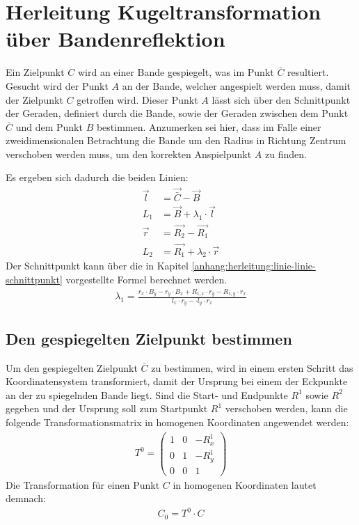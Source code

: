 \section{Herleitung Kugeltransformation über Bandenreflektion}\label{anhang:herleitung:bandenreflektion}
Ein Zielpunkt $C$ wird an einer Bande gespiegelt, was im Punkt $\bar{C}$ resultiert. Gesucht wird der Punkt $A$ an
der Bande, welcher angespielt werden muss, damit der Zielpunkt $C$ getroffen wird. Dieser Punkt $A$ lässt sich über
den Schnittpunkt der Geraden, definiert durch die Bande, sowie der Geraden zwischen dem Punkt $\bar{C}$ und dem Punkt
$B$ bestimmen. Anzumerken sei hier, dass im Falle einer zweidimensionalen Betrachtung die Bande um den Radius in Richtung
Zentrum verschoben werden muss, um den korrekten Anspielpunkt $A$ zu finden.

Es ergeben sich dadurch die beiden Linien:
\begin{align}
    \vec{l} &= \vec{\bar{C}} - \vec{B}\\
    L_1 &= \vec{B} + \lambda_1 \cdot \vec{l}\\
    \vec{r} &= \vec{R_2} - \vec{R_1}\\
    L_2 &= \vec{R_1} + \lambda_2 \cdot \vec{r}
\end{align}
Der Schnittpunkt kann über die in Kapitel \ref{anhang:herleitung:linie-linie-schnittpunkt} vorgestellte Formel
berechnet werden.
\begin{align}
    \lambda_1 = \frac{r_x \cdot B_y - r_y \cdot B_x + R_{1,x} \cdot r_y - R_{1,y} \cdot r_x}{l_x \cdot r_y - \cdot l_y \cdot r_x}
\end{align}

\subsection{Den gespiegelten Zielpunkt bestimmen}\label{anhang:herleitung:bandenreflektion:zielpunkt}
Um den gespiegelten Zielpunkt $\bar{C}$ zu bestimmen, wird in einem ersten Schritt das Koordinatensystem transformiert, damit
der Ursprung bei einem der Eckpunkte an der zu spiegelnden Bande liegt. Sind die Start- und Endpunkte $R^1$ sowie $R^2$
gegeben und der Ursprung soll zum Startpunkt $R^1$ verschoben werden, kann die folgende Transformationsmatrix in
homogenen Koordinaten angewendet werden:
\begin{align}
    T^0 = \begin{pmatrix}1 & 0 & -R^1_x\\0 & 1 & -R^1_y\\0 & 0 & 1\end{pmatrix}
\end{align}
Die Transformation für einen Punkt $C$ in homogenen Koordinaten lautet demnach:
\begin{align}
    C_0 = T^0 \cdot C
\end{align}


